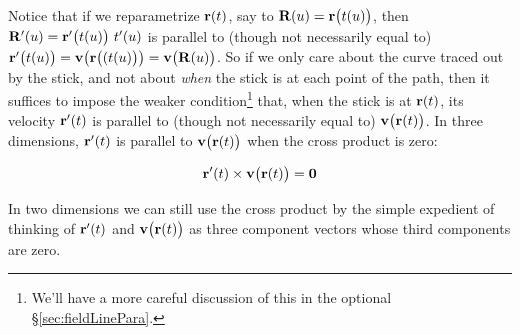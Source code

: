 Notice that if we reparametrize $\mathbf{r}(t)$, say to $\mathbf{R}(u) = \mathbf{r}\big(t(u)\big)$,
then $\mathbf{R}'(u) =   \mathbf{r}'\big(t(u)\big)\ t'(u)$ is parallel to
(though not necessarily equal to) $\mathbf{r}'\big(t(u)\big)= \mathbf{v}\big(\mathbf{r}\big((t(u)\big)\big)
                         =\mathbf{v}\big(\mathbf{R}(u)\big)$. 
So if we only care about the curve traced out by the stick, and not about 
\emph{when} the stick is at each point of the path, then it suffices to
impose the weaker condition\footnote{We'll have a more careful discussion of 
this in the optional \S\ref{sec:fieldLinePara}.} that, when the stick 
is at $\mathbf{r}(t)$, its velocity $\mathbf{r}'(t)$ is parallel to (though not necessarily equal to) 
$\mathbf{v}\big(\mathbf{r}(t)\big)$. In three dimensions, $\mathbf{r}'(t)$ is parallel to 
$\mathbf{v}\big(\mathbf{r}(t)\big)$ when the cross product is zero:
\begin{impeqn}\label{eq:VFstreamLineBB}
\begin{equation*}
\mathbf{r}'(t)\times\mathbf{v}\big(\mathbf{r}(t)\big)=\mathbf{0}
\end{equation*}
\end{impeqn}
\noindent
In two dimensions we can still use the cross product by the simple
expedient of thinking of $\mathbf{r}'(t)$ and $\mathbf{v}\big(\mathbf{r}(t)\big)$ as three component
vectors whose third components are zero. 


